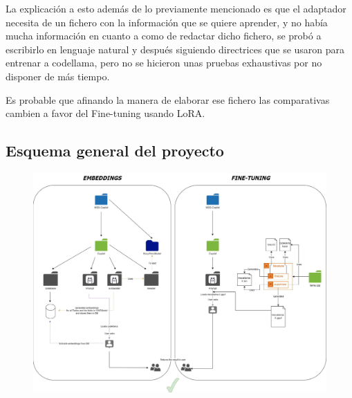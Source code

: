 La explicación a esto además de lo previamente mencionado es que el adaptador necesita de un fichero con la información que se quiere aprender, y no había mucha información en cuanto a como de redactar dicho fichero, se probó a escribirlo en lenguaje natural y después siguiendo directrices que se usaron para entrenar a codellama, pero no se hicieron unas pruebas exhaustivas por no disponer de más tiempo.

Es probable que afinando la manera de elaborar ese fichero las comparativas cambien a favor del Fine-tuning usando LoRA.
\subsection{Esquema general del proyecto}

\begin{figure}[htbp]
    \centering
    \includegraphics[width=1\textwidth]{Chapters/image.PNG}
    \label{fig:mi_imagen4}
\end{figure}

\newpage

